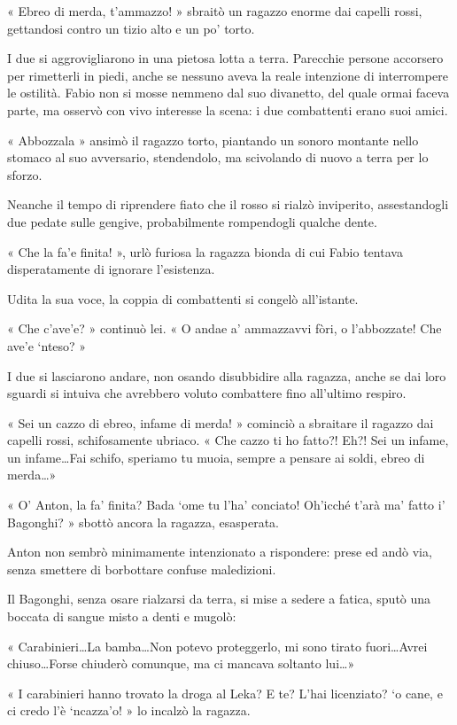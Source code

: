 « Ebreo di merda, t'ammazzo! » sbraitò un ragazzo enorme dai capelli rossi, gettandosi contro un tizio alto e un po' torto.

I due si aggrovigliarono in una pietosa lotta a terra. Parecchie persone accorsero per rimetterli in piedi, anche se nessuno aveva la reale intenzione di interrompere le ostilità. Fabio non si mosse nemmeno dal suo divanetto, del quale ormai faceva parte, ma osservò con vivo interesse la scena: i due combattenti erano suoi amici.

« Abbozzala » ansimò il ragazzo torto, piantando un sonoro montante nello stomaco al suo avversario, stendendolo, ma scivolando di nuovo a terra per lo sforzo.

Neanche il tempo di riprendere fiato che il rosso si rialzò inviperito, assestandogli due pedate sulle gengive, probabilmente rompendogli qualche dente.

« Che la fa'e finita! », urlò furiosa la ragazza bionda di cui Fabio tentava disperatamente di ignorare l'esistenza.

Udita la sua voce, la coppia di combattenti si congelò all'istante.

« Che c'ave'e? » continuò lei. « O andae a' ammazzavvi fòri, o l'abbozzate! Che ave'e `nteso? »

I due si lasciarono andare, non osando disubbidire alla ragazza, anche se dai loro sguardi si intuiva che avrebbero voluto combattere fino all'ultimo respiro.

« Sei un cazzo di ebreo, infame di merda! » cominciò a sbraitare il ragazzo dai capelli rossi, schifosamente ubriaco. « Che cazzo ti ho fatto?! Eh?! Sei un infame, un infame\ldots Fai schifo, speriamo tu muoia, sempre a pensare ai soldi, ebreo di merda\ldots »

« O' Anton, la fa' finita? Bada `ome tu l'ha' conciato! Oh'icché t'arà ma' fatto i' Bagonghi? » sbottò ancora la ragazza, esasperata.

Anton non sembrò minimamente intenzionato a rispondere: prese ed andò via, senza smettere di borbottare confuse maledizioni.

Il Bagonghi, senza osare rialzarsi da terra, si mise a sedere a fatica, sputò una boccata di sangue misto a denti e mugolò:

« Carabinieri\ldots La bamba\ldots Non potevo proteggerlo, mi sono tirato fuori\ldots Avrei chiuso\ldots Forse chiuderò comunque, ma ci mancava soltanto lui\ldots »

« I carabinieri hanno trovato la droga al Leka? E te? L'hai licenziato? `o cane, e ci credo l'è `ncazza'o! » lo incalzò la ragazza.

